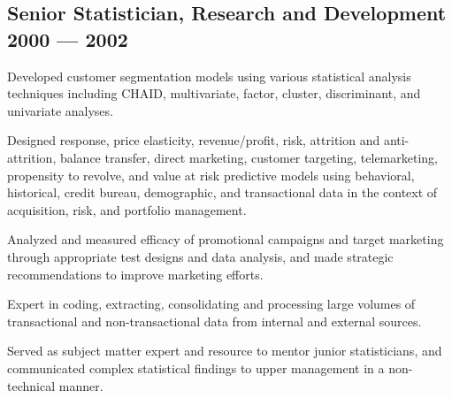 \subsection{{Senior Statistician, Research and Development \hfill 2000 ---  2002}}
\begin{zitemize}
\item Developed customer segmentation models using various statistical analysis techniques including CHAID, multivariate, factor, cluster, discriminant, and univariate analyses.
\vspace{0.2em}
\item Designed response, price elasticity, revenue/profit, risk, attrition and anti-attrition, balance transfer, direct marketing, customer targeting, telemarketing, propensity to revolve, and value at risk predictive models using behavioral, historical, credit bureau, demographic, and transactional data in the context of acquisition, risk, and portfolio management.
\vspace{0.2em}
\item Analyzed and measured efficacy of promotional campaigns and target marketing through appropriate test designs and data analysis, and made strategic recommendations to improve marketing efforts.
\vspace{0.2em}
\item Expert in coding, extracting, consolidating and processing large volumes of transactional and non-transactional data from internal and external sources.
\vspace{0.2em}
\item Served as subject matter expert and resource to mentor junior statisticians, and communicated complex statistical findings to upper management in a non-technical manner.
\end{zitemize}

